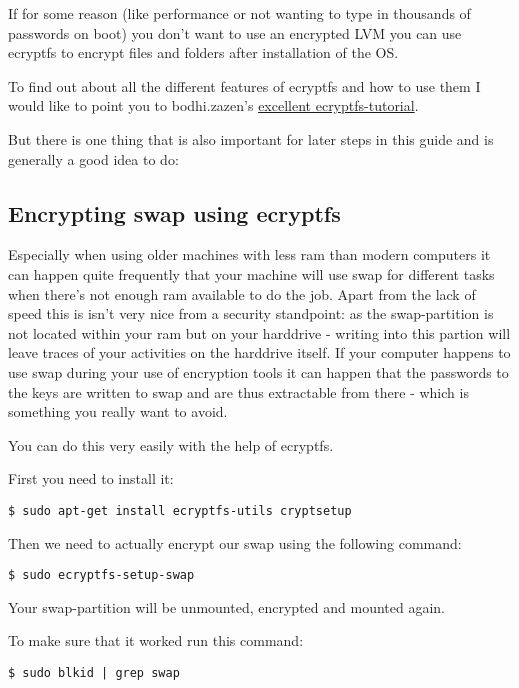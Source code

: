 \documentclass{article}
\begin{document}
 If for some reason (like performance or not wanting to type in thousands of passwords on boot) you don't want to use an encrypted LVM you can use ecryptfs to encrypt files and folders after installation of the OS.


 To find out about all the different features of ecryptfs and how to use them I would like to point you to bodhi.zazen's \href{http://bodhizazen.net/Tutorials/Ecryptfsecryptfs-tutorial}{excellent ecryptfs-tutorial}.


 But there is one thing that is also important for later steps in this guide and is generally a good idea to do:
\subsection{Encrypting swap using ecryptfs}


 Especially when using older machines with less ram than modern computers it can happen quite frequently that your machine will use swap for different tasks when there's not enough ram available to do the job. Apart from the lack of speed this is isn't very nice from a security standpoint: as the swap-partition is not located within your ram but on your harddrive - writing into this partion will leave traces of your activities on the harddrive itself. If your computer happens to use swap during your use of encryption tools it can happen that the passwords to the keys are written to swap and are thus extractable from there - which is something you really want to avoid. 


 You can do this very easily with the help of ecryptfs.


 First you need to install it:
\begin{lstlisting}
$ sudo apt-get install ecryptfs-utils cryptsetup
\end{lstlisting}



 Then we need to actually encrypt our swap using the following command:
\begin{lstlisting}
$ sudo ecryptfs-setup-swap
\end{lstlisting}



 Your swap-partition will be unmounted, encrypted and mounted again. 


 To make sure that it worked run this command:
\begin{lstlisting}
$ sudo blkid | grep swap
\end{lstlisting}
\end{document}
